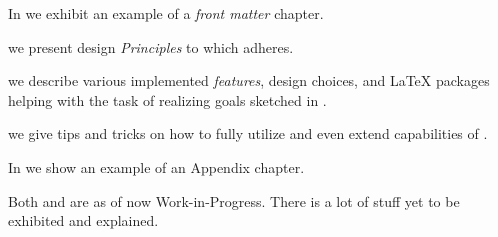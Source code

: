  \label{ch:Quick Summary}

\vspace{2ex} %


In \textbf{} we exhibit an example of a \emph{front matter} chapter.

 we present design \emph{Principles} to which \TeXtured{} adheres.

 we describe various implemented \emph{features}, design choices, and \LaTeX{} packages helping with the task of realizing goals sketched in .

 we give tips and tricks on how to fully utilize and even extend capabilities of \TeXtured{}.

In \textbf{} we show an example of an Appendix chapter.

\begin{Note}
    Both  and  are as of now Work-in-Progress. There is a lot of stuff yet to be exhibited and explained.
\end{Note}
